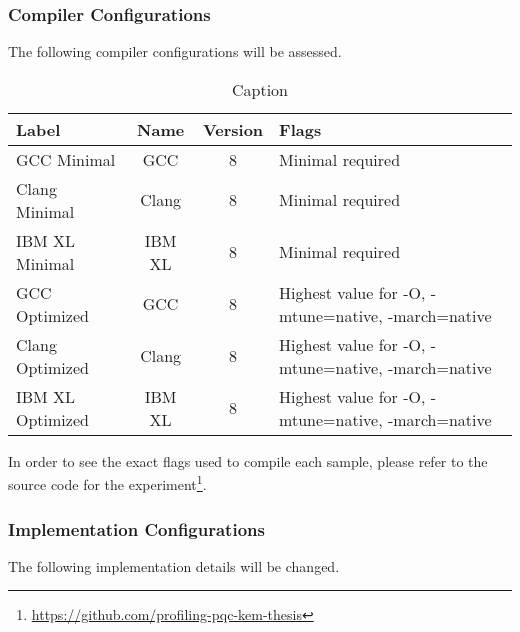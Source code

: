 \subsubsection{Compiler Configurations}

The following compiler configurations will be assessed.

\begin{table}[]
    \centering
    \begin{tabular}{l|c|c|p{4cm}}
        Label & Name & Version & Flags \\
        \hline
        GCC Minimal & GCC & 8 & Minimal required\\
        Clang Minimal & Clang & 8 & Minimal required\\
        IBM XL Minimal & IBM XL & 8 & Minimal required\\
        GCC Optimized & GCC & 8 & Highest value for -O, -mtune=native, -march=native\\
        Clang Optimized & Clang & 8 & Highest value for -O, -mtune=native, -march=native\\
        IBM XL Optimized & IBM XL & 8 & Highest value for -O, -mtune=native, -march=native\\
    \end{tabular}
    \caption{Caption}
    \label{table:method:compilers}
\end{table}

In order to see the exact flags used to compile each sample, please refer to the source code for the experiment\footnote{\href{https://github.com/profiling-pqc-kem-thesis}{https://github.com/profiling-pqc-kem-thesis}}.

\subsubsection{Implementation Configurations}

The following implementation details will be changed.

